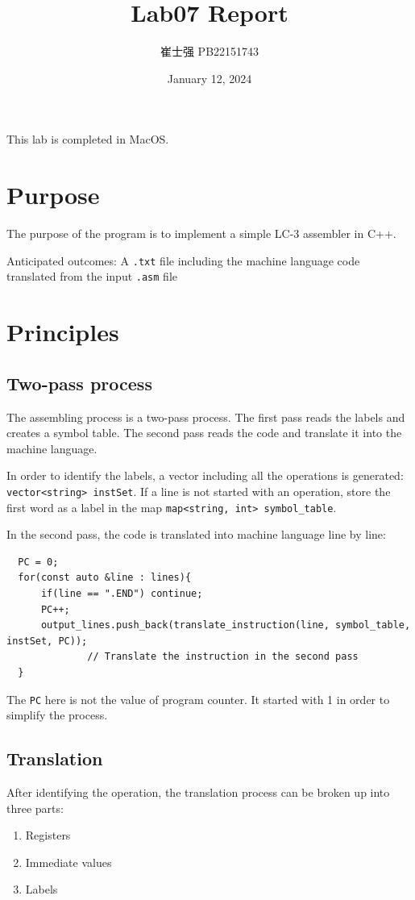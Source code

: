 \documentclass[UTF8]{ctexart}
\title{Lab07 Report}
\author{崔士强 PB22151743}
\date{January 12, 2024}
\begin{document}
\maketitle
This lab is completed in MacOS.

\section{Purpose}
The purpose of the program is to implement a simple LC-3 assembler in C++.

Anticipated outcomes: A \lstinline{.txt} file including the machine language code translated from the input \lstinline{.asm} file

\section{Principles}
\subsection{Two-pass process}
The assembling process is a two-pass process. The first pass reads the labels and creates a symbol table.
The second pass reads the code and translate it into the machine language. 

In order to identify the labels, a vector including all the operations is generated: \lstinline{vector<string> instSet}.
 If a line is not started with an operation, store the first word as a label in the map \lstinline{map<string, int> symbol_table}.

In the second pass, the code is translated into machine language line by line:
\begin{lstlisting}
  PC = 0;
  for(const auto &line : lines){
      if(line == ".END") continue;
      PC++;
      output_lines.push_back(translate_instruction(line, symbol_table, instSet, PC));       
              // Translate the instruction in the second pass
  }
\end{lstlisting}

The \lstinline{PC} here is not the value of program counter. It started with 1 in order to simplify the process.

\subsection{Translation}
After identifying the operation, the translation process can be broken up into three parts:
\begin{enumerate}
  \item Registers
  \item Immediate values
  \item Labels
\end{enumerate}
\end{document}
